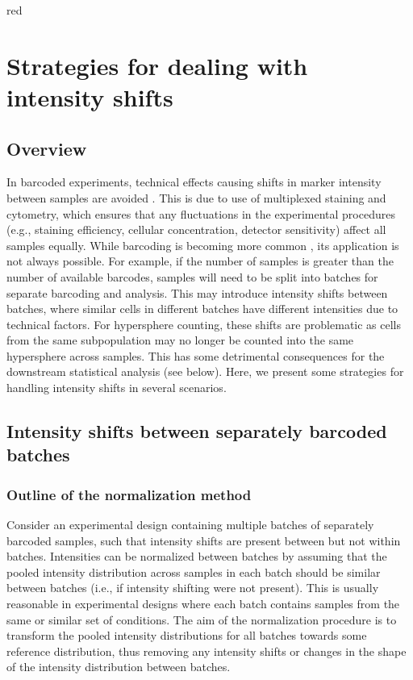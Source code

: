 \documentclass{article}
\begin{document}
\begin{color}{red}
\section{Strategies for dealing with intensity shifts}

\subsection{Overview}
In barcoded experiments, technical effects causing shifts in marker intensity between samples are avoided \cite{zunder2015palladium}.
This is due to use of multiplexed staining and cytometry, which ensures that any fluctuations in the experimental procedures (e.g., staining efficiency, cellular concentration, detector sensitivity) affect all samples equally.
While barcoding is becoming more common \cite{gaudilliere2014delayed,gaudilliere2015implementing}, its application is not always possible.
For example, if the number of samples is greater than the number of available barcodes, samples will need to be split into batches for separate barcoding and analysis.
This may introduce intensity shifts between batches, where similar cells in different batches have different intensities due to technical factors.
For hypersphere counting, these shifts are problematic as cells from the same subpopulation may no longer be counted into the same hypersphere across samples.
This has some detrimental consequences for the downstream statistical analysis (see below).
Here, we present some strategies for handling intensity shifts in several scenarios.

\subsection{Intensity shifts between separately barcoded batches}

\subsubsection{Outline of the normalization method}
Consider an experimental design containing multiple batches of separately barcoded samples, such that intensity shifts are present between but not within batches.
Intensities can be normalized between batches by assuming that the pooled intensity distribution across samples in each batch should be similar between batches (i.e., if intensity shifting were not present).
This is usually reasonable in experimental designs where each batch contains samples from the same or similar set of conditions.
The aim of the normalization procedure is to transform the pooled intensity distributions for all batches towards some reference distribution, thus removing any intensity shifts or changes in the shape of the intensity distribution between batches.


\end{color}
\end{document}
